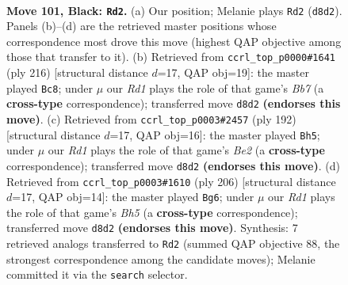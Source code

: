 \documentclass[11pt]{article}
\begin{document}
\clearpage

\begin{figure}[p]\centering
\begin{subfigure}{0.46\textwidth}\centering
\resizebox{\linewidth}{!}{%
\newchessgame
\chessboard[
  setfen={3r4/5pk1/6p1/4P3/1n3P2/1B4p1/8/5K2 b - - 1 101},
  showmover=false,
  pgfstyle=straightmove, color=movearrow, markmove={d8-d2}
]}
\caption{}
\end{subfigure}\hfill
\begin{subfigure}{0.46\textwidth}\centering
\resizebox{\linewidth}{!}{%
\newchessgame
\chessboard[
  setfen={8/1B4k1/3b4/6p1/8/5PPP/5K2/8 w - - 35 109},
  showmover=false,
  pgfstyle=straightmove, color=movearrow, markmove={b7-c8}
]}
\caption{}
\end{subfigure}
\\[4pt]
\begin{subfigure}{0.46\textwidth}\centering
\resizebox{\linewidth}{!}{%
\newchessgame
\chessboard[
  setfen={3k4/8/3pP3/3P4/1PK5/8/4B3/4b3 w - - 3 97},
  showmover=false,
  pgfstyle=straightmove, color=movearrow, markmove={e2-h5}
]}
\caption{}
\end{subfigure}\hfill
\begin{subfigure}{0.46\textwidth}\centering
\resizebox{\linewidth}{!}{%
\newchessgame
\chessboard[
  setfen={8/8/1k1p4/3P3B/1PK2p2/2P5/8/4b3 w - - 13 104},
  showmover=false,
  pgfstyle=straightmove, color=movearrow, markmove={h5-g6}
]}
\caption{}
\end{subfigure}
\caption{\textbf{Move 101, Black: \texttt{Rd2}.} (a) Our position; Melanie plays \texttt{Rd2} (\texttt{d8d2}). Panels (b)--(d) are the retrieved master positions whose correspondence most drove this move (highest QAP objective among those that transfer to it). (b) Retrieved from \texttt{ccrl\_top\_p0000\#1641} (ply 216) [structural distance $d$=17, QAP obj=19]: the master played \texttt{Bc8}; under $\mu$ our \emph{Rd1} plays the role of that game's \emph{Bb7} (a \textbf{cross-type} correspondence); transferred move \texttt{d8d2} \textbf{(endorses this move)}. (c) Retrieved from \texttt{ccrl\_top\_p0003\#2457} (ply 192) [structural distance $d$=17, QAP obj=16]: the master played \texttt{Bh5}; under $\mu$ our \emph{Rd1} plays the role of that game's \emph{Be2} (a \textbf{cross-type} correspondence); transferred move \texttt{d8d2} \textbf{(endorses this move)}. (d) Retrieved from \texttt{ccrl\_top\_p0003\#1610} (ply 206) [structural distance $d$=17, QAP obj=14]: the master played \texttt{Bg6}; under $\mu$ our \emph{Rd1} plays the role of that game's \emph{Bh5} (a \textbf{cross-type} correspondence); transferred move \texttt{d8d2} \textbf{(endorses this move)}. Synthesis: 7 retrieved analogs transferred to \texttt{Rd2} (summed QAP objective 88, the strongest correspondence among the candidate moves); Melanie committed it via the \texttt{search} selector.}
\label{fig:thought-m201}
\end{figure}
\end{document}
